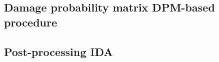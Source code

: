 		\subsection{Damage probability matrix DPM-based procedure}
		\label{subsec:nld-dpm}
		

		\subsection{Post-processing IDA}
		\label{subsec:nld-ida}
		


